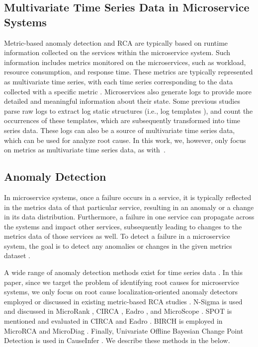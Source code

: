 \subsection{Multivariate Time Series Data in Microservice Systems}

Metric-based anomaly detection and RCA are typically based on runtime information collected on the services within the microservice system. Such information includes metrics monitored on the microservices, such as workload, resource consumption, and response time. These metrics are typically represented as multivariate time series, with each time series corresponding to the data collected with a specific metric \cite{Soldani2022rcasurvey}. Microservices also generate logs to provide more detailed and meaningful information about their state. Some previous studies~\cite{wang2021detecting, aggarwal2020localization, aggarwal2021causal} parse raw logs to extract log static structures (i.e., log templates \cite{le2023log}), and count the occurrences of these templates, which are subsequently transformed into time series data. These logs can also be a source of multivariate time series data, which can be used for analyze root cause. In this work, we, however, only focus on metrics as multivariate time series data, as with~\cite{Li2022Circa, Azam2022rcd, wu2020microrca, wu2021microdiag, thalheim2017sieve, Meng2020Microcause, Wang2018cloudranger, liu2021microhecl}.


\vspace{-0.1cm}
\subsection{Anomaly Detection} \label{sec:background-ad}

In microservice systems, once a failure occurs in a service, it is typically reflected in the metrics data of that particular service, resulting in an anomaly or a change in its data distribution. Furthermore, a failure in one service can propagate across the systems and impact other services, subsequently leading to changes to the metrics data of those services as well. To detect a failure in a microservice system, the goal is to detect any anomalies or changes in the given metrics dataset \cite{Soldani2022rcasurvey}.


A wide range of anomaly detection methods exist for time series data \cite{BlazquezGarc2021ADreview}. In this paper, since we target the problem of identifying root causes for microservice systems, we only focus on root cause localization-oriented anomaly detectors employed or discussed in existing metric-based RCA studies \cite{lee2023eadro}. N-Sigma \cite{Jinjin2018Microscope} is used and discussed in MicroRank \cite{yu2021microrank}, CIRCA \cite{Li2022Circa}, Eadro \cite{lee2023eadro}, and MicroScope \cite{Jinjin2018Microscope}. SPOT \cite{siffer2017anomaly} is mentioned and evaluated in CIRCA \cite{Li2022Circa} and Eadro \cite{lee2023eadro}.  BIRCH \cite{zhang1996birch} is employed in MicroRCA \cite{wu2020microrca}  and MicroDiag \cite{wu2021microdiag}. Finally, Univariate Offline Bayesian Change Point Detection \cite{adams2007bayesian} is used in CauseInfer \cite{Chen2014Causeinfer, chen2016causeinfer}. We describe these methods in the below.


